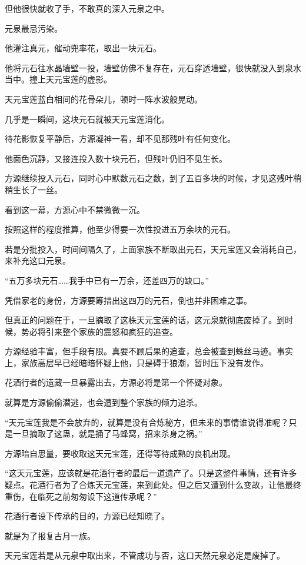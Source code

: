 \begin{this_body}
但他很快就收了手，不敢真的深入元泉之中。

元泉最忌污染。

他灌注真元，催动兜率花，取出一块元石。

他将元石往水晶墙壁一投，墙壁仿佛不复存在，元石穿透墙壁，很快就没入到泉水当中。撞上天元宝莲的虚影。

天元宝莲蓝白相间的花骨朵儿，顿时一阵水波般晃动。

几乎是一瞬间，这块元石就被天元宝莲消化。

待花影恢复平静后，方源凝神一看，却不见那残叶有任何变化。

他面色沉静，又接连投入数十块元石，但残叶仍旧不见生长。

方源继续投入元石，同时心中默数元石之数，到了五百多块的时候，才见这残叶稍稍生长了一丝。

看到这一幕，方源心中不禁微微一沉。

按照这样的程度推算，他至少得要一次性投进五万余块的元石。

若是分批投入，时间间隔久了，上面家族不断取出元石，天元宝莲又会消耗自己，来补充这口元泉。

“五万多块元石……我手中已有一万余，还差四万的缺口。”

凭借家老的身份，方源要筹措出这四万的元石，倒也并非困难之事。

但真正的问题在于，一旦摘取了这株天元宝莲的话，这元泉就彻底废掉了。到时候，势必将引来整个家族的震怒和疯狂的追查。

方源经验丰富，但手段有限。真要不顾后果的追查，总会被查到蛛丝马迹。事实上，家族高层早已经暗暗怀疑上他，只是碍于狼潮，暂时压下没有发作。

花酒行者的遗藏一旦暴露出去，方源必将是第一个怀疑对象。

就算是方源偷偷潜逃，也会遭到整个家族的倾力追杀。

“天元宝莲我是不会放弃的，就算是没有合炼秘方，但未来的事情谁说得准呢？只是一旦摘取了这蛊，就是捅了马蜂窝，招来杀身之祸。”

方源暗自思量，要收取这天元宝莲，还得等待成熟的良机出现。

“这天元宝莲，应该就是花酒行者的最后一道遗产了。只是这整件事情，还有许多疑点。花酒行者为了合炼天元宝莲，来到此处。但之后又遭到什么变故，让他最终重伤，在临死之前匆匆设下这道传承呢？”

花酒行者设下传承的目的，方源已经知晓了。

就是为了报复古月一族。

天元宝莲若是从元泉中取出来，不管成功与否，这口天然元泉必定是废掉了。


\end{this_body}
